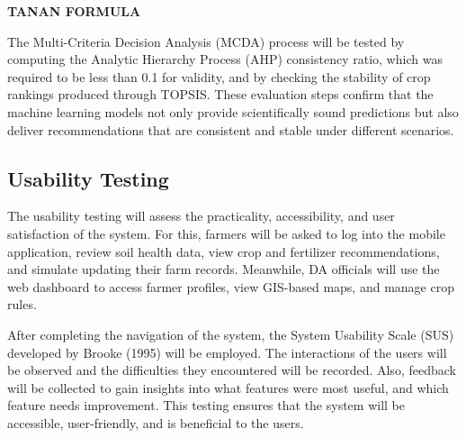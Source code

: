 {	\textbf{TANAN FORMULA}
	
	The Multi-Criteria Decision Analysis (MCDA) process will be tested by computing the Analytic Hierarchy Process (AHP) consistency ratio, which was required to be less than 0.1 for validity, and by checking the stability of crop rankings produced through TOPSIS. These evaluation steps confirm that the machine learning models not only provide scientifically sound predictions but also deliver recommendations that are consistent and stable under different scenarios.
	
	\subsection{Usability Testing}
	The usability testing will assess the practicality, accessibility, and user satisfaction of the system. For this, farmers will be asked to log into the mobile application, review soil health data, view crop and fertilizer recommendations, and simulate updating their farm records. Meanwhile, DA officials will use the web dashboard to access farmer profiles, view GIS-based maps, and manage crop rules.
	
	After completing the navigation of the system, the System Usability Scale (SUS) developed by Brooke (1995) will be employed. The interactions of the users will be observed and the difficulties they encountered will be recorded. Also, feedback will be collected to gain insights into what features were most useful, and which feature needs improvement. This testing ensures that the system will be accessible, user-friendly, and is beneficial to the users.
	
}
